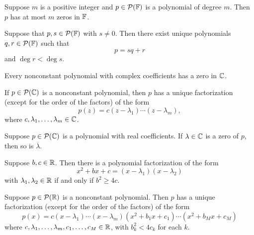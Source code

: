\documentclass{extarticle}
\begin{document}
\begin{thm}
    Suppose \(m\) is a positive integer and \(p \in \mathcal{P}(\mathbb{F})\) is a polynomial of degree \(m\). 
    Then \(p\) has at most \(m\) zeros in \(\mathbb{F}\). 
\end{thm}

\begin{thm}
    Suppose that \(p, s \in \mathcal{P}(\mathbb{F})\) with \(s \neq 0\). Then there exist unique polynomials 
    \(q, r \in \mathcal{P}(\mathbb{F})\) such that 
    \[p = sq + r\]
    and \(\deg r < \deg s\). 
\end{thm}

\begin{thm}
    Every nonconstant polynomial with complex coefficients has a zero in \(\mathbb{C}\). 
\end{thm}

\begin{thm}
    If \(p \in \mathcal{P}(\mathbb{C})\) is a nonconstant polynomial, then \(p\) has a unique factorization 
    (except for the order of the factors) of the form 
    \[p(z) = c(z - \lambda_1) \cdots (z - \lambda_m),\]
    where \(c, \lambda_1, \ldots, \lambda_m \in \mathbb{C}\). 
\end{thm}

\begin{lemma}
    Suppose \(p \in \mathcal{P}(\mathbb{C})\) is a polynomial with real coefficients. If \(\lambda \in \mathbb{C}\)
    is a zero of \(p\), then so is \(\overline{\lambda}\). 
\end{lemma}

\begin{thm}
    Suppose \(b, c \in \mathbb{R}\). Then there is a polynomial factorization of the form 
    \[x^2 + bx + c = (x - \lambda_1)(x - \lambda_2)\]
    with \(\lambda_1, \lambda_2 \in \mathbb{R}\) if and only if \(b^2 \geq 4c\). 
\end{thm}

\begin{thm}
    Suppose \(p \in \mathcal{P}(\mathbb{R})\) is a nonconstant polynomial. Then \(p\) has a unique factorization 
    (except for the order of the factors) of the form 
    \[p(x) = c(x-\lambda_1)\cdots(x - \lambda_m)(x^2 + b_1x + c_1) \cdots(x^2 + b_M x + c_M)\]
    where \(c, \lambda_1, \ldots, \lambda_m, c_1, \ldots, c_M \in \mathbb{R}\), with 
    \(b_k^2 < 4 c_k\) for each \(k\). 
\end{thm}
\end{document}
